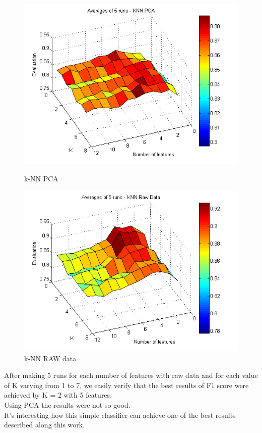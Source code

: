 \documentclass[english, a4paper, 12pt]{article}
\newcommand{\tab}{\hspace*{2em}}
\begin{document}
\begin{figure}[H]
	\centering
	\begin{minipage}[b]{0.45\linewidth}
		\includegraphics[scale= 0.5]{knn_pca.png}
		\caption{k-NN PCA}
		\label{fig:minipage1}
	\end{minipage}
	\quad	
	\begin{minipage}[b]{0.45\linewidth}
		\includegraphics[scale= 0.5]{knn_raw_data.png}
		\caption{k-NN RAW data}
		\label{fig:minipage2}
	\end{minipage}
\end{figure}

\tab After making 5 runs for each number of features with raw data and for each value of K varying from 1 to 7, we easily verify that the best results of F1 score were achieved by K = 2 with 5 features.\smallskip\\
\tab Using PCA the results were not so good.\smallskip\\
\tab It’s interesting how this simple classifier can achieve one of the best results described along this work.\smallskip\\
\end{document}
